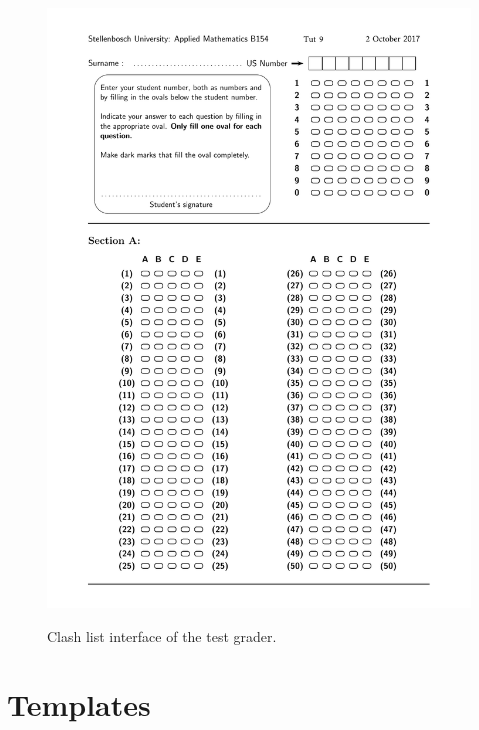 \begin{figure}
  \centering
  \includegraphics[width=14cm]{clashInterface}\\
  \caption{Clash list interface of the test grader.}
  \label{fig:clashInterface}
\end{figure}

\section{Templates}

